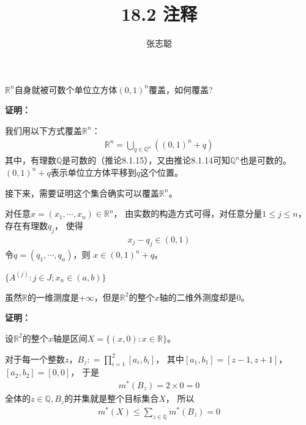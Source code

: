 \documentclass{article}
\begin{document}
\title{18.2 注释}
\author{张志聪}
\maketitle

\begin{zremark}
  $\mathbb{R}^n$自身就被可数个单位立方体$(0,1)^n$覆盖，如何覆盖?
\end{zremark}

\textbf{证明：}

我们用以下方式覆盖$\mathbb{R}^n$：
\begin{align*}
  \mathbb{R}^n = \bigcup\limits_{q \in \mathbb{Q}^n}((0, 1)^n + q)
\end{align*}
其中，有理数$\mathbb{Q}$是可数的（推论8.1.15），又由推论8.1.14可知$\mathbb{Q}^n$也是可数的。 
$(0, 1)^n + q$表示单位立方体平移到$q$这个位置。

接下来，需要证明这个集合确实可以覆盖$\mathbb{R}^n$。

对任意$x = (x_1, \cdots, x_n) \in \mathbb{R}^n$，
由实数的构造方式可得，对任意分量$1 \leq j \leq n$，
存在有理数$q_j$，
使得
\begin{align*}
  x_j - q_j \in (0, 1) 
\end{align*}
令$q = (q_1, \cdots, q_n)$，则
$x \in (0, 1)^n + q$。

$\{A^{(j)}: j \in J; x_n \in (a, b)\}$

\begin{zremark}
  虽然$\mathbb{R}$的一维测度是$+\infty$，但是$\mathbb{R}^2$的整个$x$轴的二维外测度却是$0$。  
\end{zremark}

\textbf{证明：}

设$\mathbb{R}^2$的整个$x$轴是区间$X = \{(x, 0): x \in \mathbb{R}\}$。

对于每一个整数$z$，$B_z : = \prod \limits_{i = 1}^2 [a_i, b_i]$，
其中$[a_1, b_1]= [z - 1, z + 1]$，$[a_2, b_2] = [0, 0]$，
于是
\begin{align*}
  m^{\ast}(B_z) = 2 \times 0 = 0
\end{align*}
全体的$z \in \mathbb{Q}, B_z$的并集就是整个目标集合$X$，
所以
\begin{align*}
  m^{\ast}(X) \leq \sum \limits_{z \in \mathbb{Q}} m^{\ast}(B_z) = 0
\end{align*}
\end{document}
